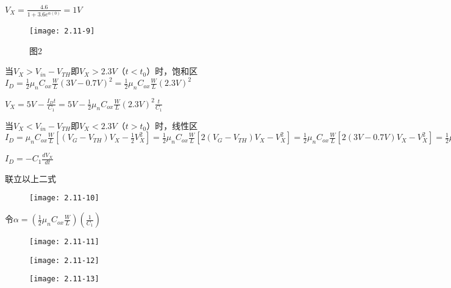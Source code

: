 $V_X=\frac{4.6}{1+3.6e^{\alpha (0)}}=1V$

		\begin{figure}[H] %
	\begin{minipage}{\linewidth}
		\texttt{[image: 2.11-9]}
	\end{minipage}
	\caption*{图2} %
\end{figure}

\scalebox{3}{（c）}

当$V_{X}>V_{in}-V_{TH}$即$V_{X}>2.3V$（$t<t_0$）时，饱和区$I_D=\frac{1}{2}\mu_nC_{ox}\frac{W}{L}(3V-0.7V)^2=\frac{1}{2}\mu_nC_{ox}\frac{W}{L}(2.3V)^2$

$V_X=5V-\frac{I_Dt}{C_1}=5V-\frac{1}{2}\mu_nC_{ox}\frac{W}{L}(2.3V)^2\frac{t}{C_1}$

当$V_{X}<V_{in}-V_{TH}$即$V_{X}<2.3V$（$t>t_0$）时，线性区$I_D=\mu_nC_{ox}\frac{W}{L}[(V_{G}-V_{TH})V_{X}-\frac{1}{2}V_{X}^2]=\frac{1}{2}\mu_nC_{ox}\frac{W}{L}[2(V_{G}-V_{TH})V_{X}-V_{X}^2]=\frac{1}{2}\mu_nC_{ox}\frac{W}{L}[2(3V-0.7V)V_{X}-V_{X}^2]=\frac{1}{2}\mu_nC_{ox}\frac{W}{L}[(4.6V)V_{X}-V_{X}^2]$

$I_D=-C_1\frac{dV_X}{dt}$

联立以上二式

	\begin{figure}[H] %
	\begin{minipage}{\linewidth}
		\texttt{[image: 2.11-10]}
	\end{minipage}
\end{figure}


令$\alpha=(\frac{1}{2}\mu_nC_{ox}\frac{W}{L})(\frac{1}{C_1})$

	\begin{figure}[H] %
	\begin{minipage}{\linewidth}
		\texttt{[image: 2.11-11]}
	\end{minipage}
\end{figure}

	\begin{figure}[H] %
	\begin{minipage}{\linewidth}
		\texttt{[image: 2.11-12]}
	\end{minipage}
\end{figure}

	\begin{figure}[H] %
	\begin{minipage}{\linewidth}
		\texttt{[image: 2.11-13]}
	\end{minipage}
\end{figure}

